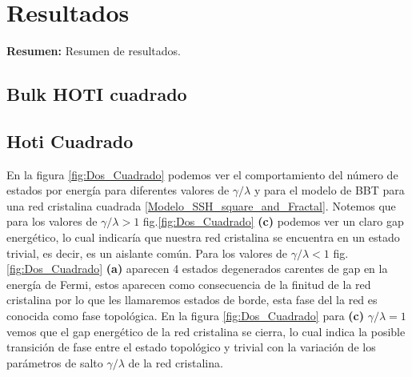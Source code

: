 \chapter{Resultados}

\begin{center}
\begin{minipage}{0.9\textwidth}
{\small
{\bf Resumen:} Resumen de resultados.
}
\end{minipage}
\end{center}

\section{Bulk HOTI cuadrado}



\section{Hoti Cuadrado}

En la figura \ref{fig:Dos_Cuadrado} podemos ver el comportamiento del número de estados por energía para diferentes valores de $\gamma/\lambda$ y para el modelo de BBT para una red cristalina cuadrada \ref{Modelo_SSH_square_and_Fractal}. Notemos que para los valores de $\gamma/\lambda>1$ fig.\ref{fig:Dos_Cuadrado} \textbf{(c)} podemos ver un claro gap energético, lo cual indicaría que nuestra red cristalina se encuentra en un estado trivial, es decir, es un aislante común. Para los valores de $\gamma/\lambda<1$ fig. \ref{fig:Dos_Cuadrado} \textbf{(a)} aparecen 4 estados degenerados carentes de gap en la energía de Fermi, estos aparecen como consecuencia de la finitud de la red cristalina por lo que les llamaremos estados de borde, esta fase del la red es conocida como fase topológica. En la figura \ref{fig:Dos_Cuadrado} para  \textbf{(c)} $\gamma/\lambda = 1$ vemos que el gap energético de la red cristalina se cierra, lo cual indica la posible transición de fase entre el estado topológico y trivial con la variación de los parámetros de salto $\gamma/\lambda$ de la red cristalina.


